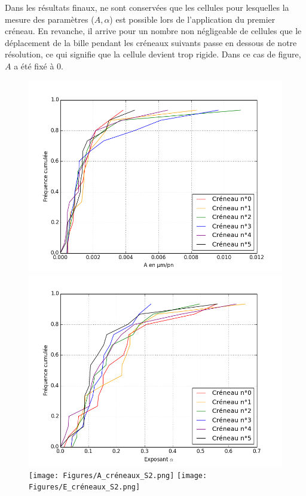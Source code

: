 Dans les résultats finaux, ne sont conservées que les cellules pour lesquelles la mesure des paramètres ($A, \alpha$) est possible lors de l'application du premier créneau. 
En revanche, il arrive pour un nombre non négligeable de cellules que le déplacement de la bille pendant les créneaux suivants passe en dessous de notre résolution, ce qui signifie que la cellule devient trop rigide. Dans ce cas de figure, $A$ a été fixé à 0. 

\begin{figure}
\includegraphics[scale=0.3]{Figures/A_créneaux_témoin.png}
\includegraphics[scale=0.3]{Figures/E_créneaux_témoin.png} 
\\
\texttt{[image: Figures/A\_créneaux\_S2.png]} 
\texttt{[image: Figures/E\_créneaux\_S2.png]} 
\caption{\label{Evolution_6c}} 
\end{figure}

